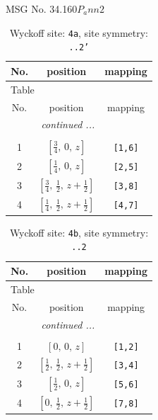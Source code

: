 \documentclass[fleqn,8pt]{jsarticle}
\begin{document}
\setcounter{MaxMatrixCols}{32}

\renewcommand{\tablename}{Table~}
\renewcommand{\figurename}{Figure~}
\begin{center}
\LARGE
MSG No. 34.160\quad$P_{a}nn2$
\end{center}
\renewcommand{\arraystretch}{1.2}
\begin{longtable}{ccc}
\caption{Wyckoff site: {\tt 4a}, site symmetry: {\tt ..2'}}
 \\
 \hline \hline
No. & position & mapping \\ \hline \endfirsthead

\multicolumn{2}{l}{\tablename\ \thetable{}} \\
 \hline \hline
No. & position & mapping \\ \hline \endhead

 \hline \hline
\multicolumn{2}{r}{\footnotesize\it continued ...} \\ \endfoot

 \hline \hline
\multicolumn{2}{r}{} \\ \endlastfoot

1 & $\left[ \frac{3}{4},\, 0,\, z \right]$ & {\tt [1,6]} \\ \hline
2 & $\left[ \frac{1}{4},\, 0,\, z \right]$ & {\tt [2,5]} \\ \hline
3 & $\left[ \frac{3}{4},\, \frac{1}{2},\, z + \frac{1}{2} \right]$ & {\tt [3,8]} \\ \hline
4 & $\left[ \frac{1}{4},\, \frac{1}{2},\, z + \frac{1}{2} \right]$ & {\tt [4,7]} \\
\end{longtable}
\renewcommand{\arraystretch}{1.2}
\begin{longtable}{ccc}
\caption{Wyckoff site: {\tt 4b}, site symmetry: {\tt ..2}}
 \\
 \hline \hline
No. & position & mapping \\ \hline \endfirsthead

\multicolumn{2}{l}{\tablename\ \thetable{}} \\
 \hline \hline
No. & position & mapping \\ \hline \endhead

 \hline \hline
\multicolumn{2}{r}{\footnotesize\it continued ...} \\ \endfoot

 \hline \hline
\multicolumn{2}{r}{} \\ \endlastfoot

1 & $\left[ 0,\, 0,\, z \right]$ & {\tt [1,2]} \\ \hline
2 & $\left[ \frac{1}{2},\, \frac{1}{2},\, z + \frac{1}{2} \right]$ & {\tt [3,4]} \\ \hline
3 & $\left[ \frac{1}{2},\, 0,\, z \right]$ & {\tt [5,6]} \\ \hline
4 & $\left[ 0,\, \frac{1}{2},\, z + \frac{1}{2} \right]$ & {\tt [7,8]} \\
\end{longtable}
\end{document}

